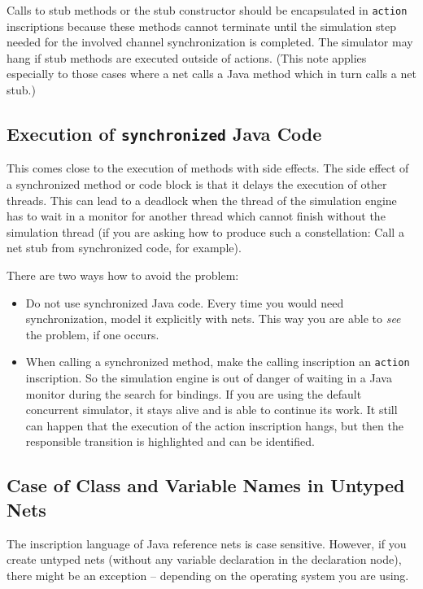 Calls to stub methods or the stub constructor should be
encapsulated in \texttt{action} inscriptions because these
methods cannot terminate until the simulation step needed for the
involved channel synchronization is completed. The simulator
may hang if stub methods are executed outside of actions.
(This note applies especially to those cases where a net calls a
Java method which in turn calls a net stub.)


\subsection{Execution of \texttt{synchronized} Java Code}

This comes close to the execution of methods with side
effects. The side effect of a synchronized method or code block
is that it delays the execution of other threads. This can lead
to a deadlock when the thread of the simulation engine has to
wait in a monitor for another thread which cannot finish without
the simulation thread (if you are asking how to produce such a
constellation: Call a net stub from synchronized code, for
example).

There are two ways how to avoid the problem:
\begin{itemize}
\item Do not use synchronized Java code. Every time you
  would need synchronization, model it explicitly with nets. This
  way you are able to \emph{see} the problem, if one occurs.
\item When calling a synchronized method, make the calling
  inscription an \texttt{action} inscription. So the simulation
  engine is out of danger of waiting in a Java monitor during the
  search for bindings. If you are using the default concurrent
  simulator, it stays alive and is able to continue its work.
  It still can happen that the execution of the action
  inscription hangs, but then the responsible transition is
  highlighted and can be identified.
\end{itemize}

\subsection{Case of Class and Variable Names in Untyped Nets}

The inscription language of Java reference nets is case sensitive.
However, if you create untyped nets (without any variable declaration in
the declaration node), there might be an exception -- depending on the
operating system you are using.

